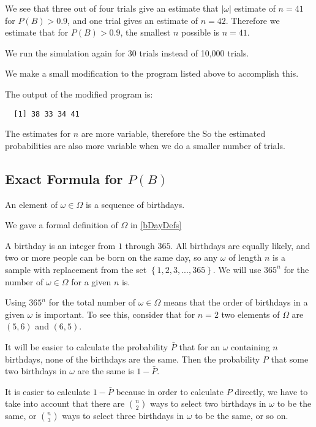 \documentclass[a4paper,11pt]{article}
\begin{document}
We see that three out of four trials give an estimate that
$\left| \omega \right|$ estimate of $n=41$ for $P\left(B \right) > 0.9$,
and one trial gives an estimate of $n=42$.  Therefore we estimate that
for $P\left(B \right) > 0.9$, the smallest $n$ possible is $n=41$.

We run the simulation again for 30 trials instead of 10,000 trials.

We make a small modification to the program listed above to accomplish
this.

The output of the modified program is:

\begin{lstlisting}
  [1] 38 33 34 41
\end{lstlisting}

The estimates for $n$ are more variable, therefore the So the estimated 
probabilities are also more variable when we do a smaller number of
trials.

\subsection{Exact Formula for $P \left( B \right)$}

An element of $\omega \in \Omega$ is a sequence of birthdays.  

We gave a formal definition of $\Omega$ in \ref{bDayDefs}

A birthday is an integer from $1$ through $365$. 
All birthdays are equally likely, and two or more people can be born on
the same day, so any $\omega$ of length $n$ is a sample with replacement
from the set $\left\{ 1, 2, 3, ..., 365 \right\}$. We will use
$365^{n}$ for the number of $\omega \in \Omega$ for a given $n$ is.

Using $365^{n}$ for the total number of $\omega \in \Omega$ means
that the order of birthdays in a given $\omega$ is important.
To see this, consider that for $n=2$ two elements of $\Omega$ are
$\left( 5, 6 \right)$ and $\left(6, 5\right)$.

It will be easier to calculate the probability $\bar{P}$ that for an
$\omega$ containing $n$ birthdays, none of the birthdays are the same.
Then the probability $P$ that some two birthdays in $\omega$ are the
same  is $1-\bar{P}$.

It is easier to calculate $1-\bar{P}$ because in order to calculate $P$
directly, we have to take into account that there are $\binom{n}{2}$
ways to select two birthdays in $\omega$ to be the same, or 
$\binom{n}{3}$ ways to select three birthdays in $\omega$ to be the same,
or so on.
\end{document}
